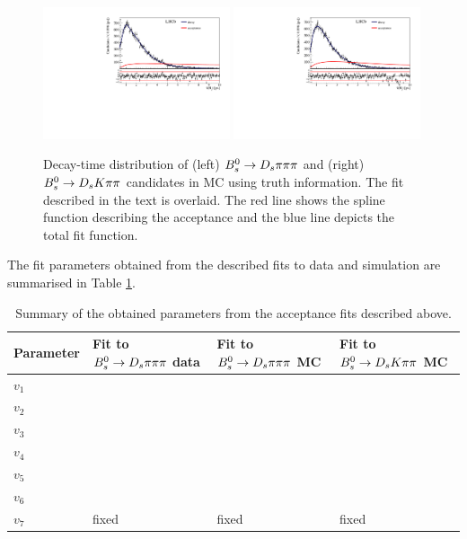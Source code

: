 \begin{figure}[h]
\includegraphics[height=7.cm,width=0.49\textwidth]{figs/SplineAcc_MCFit_combined_trueCT_Norm.pdf}
\includegraphics[height=7.cm,width=0.49\textwidth]{figs/SplineAcc_MCFit_combined_trueCT_Sig.pdf}
\caption{Decay-time distribution of (left) ${{B}^0_{s}}\rightarrow{\ensuremath{{D}_{s}}}{\ensuremath{\pi}}{\ensuremath{\pi}}{\ensuremath{\pi}}$ and (right) ${{B}^0_{s}}\rightarrow{\ensuremath{{D}_{s}}}{\ensuremath{K}}{\ensuremath{\pi}}{\ensuremath{\pi}}$ candidates in MC using truth information. The fit described in the text is overlaid.
The red line shows the spline function describing the acceptance and the blue line depicts the total fit function.}
\label{fig:AccFit_MC}
\end{figure}

The fit parameters obtained from the described fits to data and simulation are summarised in Table \ref{table: Splines}.



\begin{table}[h]
\centering
 \begin{tabular}{l l l l}
Parameter & Fit to ${{B}^0_{s}}\rightarrow{\ensuremath{{D}_{s}}}{\ensuremath{\pi}}{\ensuremath{\pi}}{\ensuremath{\pi}}$ data & Fit to ${{B}^0_{s}}\rightarrow{\ensuremath{{D}_{s}}}{\ensuremath{\pi}}{\ensuremath{\pi}}{\ensuremath{\pi}}$ MC & Fit to ${{B}^0_{s}}\rightarrow{\ensuremath{{D}_{s}}}{\ensuremath{K}}{\ensuremath{\pi}}{\ensuremath{\pi}}$ MC \\
\hline
$v_{1}$ & & & \\
$v_{2}$ & & & \\
$v_{3}$ & & & \\
$v_{4}$ & & & \\
$v_{5}$ & & & \\
$v_{6}$ & & & \\
$v_{7}$ & fixed & fixed & fixed\\
\end{tabular}
\caption{Summary of the obtained parameters from the acceptance fits described above.}
\label{table: Splines}
\end{table}


